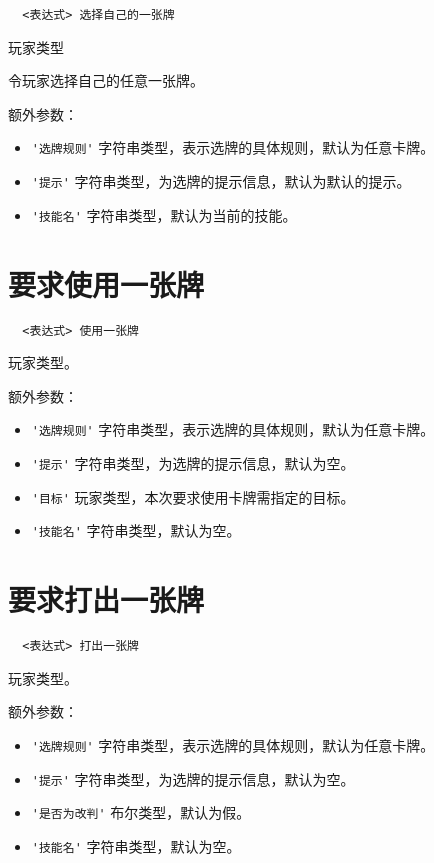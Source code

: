 \begin{verbatim}
  <表达式> 选择自己的一张牌
\end{verbatim}

玩家类型

令玩家选择自己的任意一张牌。

额外参数：

\begin{itemize}
  \item \verb|'选牌规则'| 字符串类型，表示选牌的具体规则，默认为任意卡牌。
  \item \verb|'提示'| 字符串类型，为选牌的提示信息，默认为默认的提示。
  \item \verb|'技能名'| 字符串类型，默认为当前的技能。
\end{itemize}

\section{要求使用一张牌}

\begin{verbatim}
  <表达式> 使用一张牌
\end{verbatim}

玩家类型。

额外参数：

\begin{itemize}
  \item \verb|'选牌规则'| 字符串类型，表示选牌的具体规则，默认为任意卡牌。
  \item \verb|'提示'| 字符串类型，为选牌的提示信息，默认为空。
  \item \verb|'目标'| 玩家类型，本次要求使用卡牌需指定的目标。
  \item \verb|'技能名'| 字符串类型，默认为空。
\end{itemize}

\section{要求打出一张牌}

\begin{verbatim}
  <表达式> 打出一张牌
\end{verbatim}

玩家类型。

额外参数：

\begin{itemize}
  \item \verb|'选牌规则'| 字符串类型，表示选牌的具体规则，默认为任意卡牌。
  \item \verb|'提示'| 字符串类型，为选牌的提示信息，默认为空。
  \item \verb|'是否为改判'| 布尔类型，默认为假。
  \item \verb|'技能名'| 字符串类型，默认为空。
\end{itemize}

